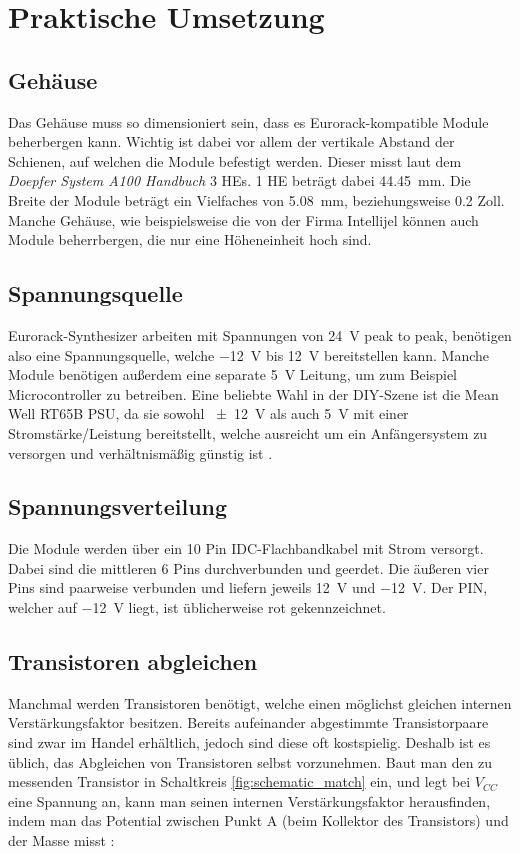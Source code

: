 \chapter{Praktische Umsetzung}

\section{Gehäuse}
\label{sec:orgbf5b01b}
Das Gehäuse muss so dimensioniert sein, dass es Eurorack-kompatible Module beherbergen kann. Wichtig ist dabei vor allem der vertikale Abstand der Schienen, auf welchen die Module befestigt werden. Dieser misst laut dem \emph{Doepfer System A100 Handbuch} \cite{doepfer:A-100} 3 \acp{HE}. 1 \ac{HE} beträgt dabei \SI{44.45}{\milli\meter}. Die Breite der Module beträgt ein Vielfaches von \SI{5.08}{\milli\meter}, beziehungsweise 0.2 Zoll. Manche Gehäuse, wie beispielsweise die von der Firma Intellijel können auch Module beherrbergen, die nur eine Höheneinheit hoch sind.

\section{Spannungsquelle}
\label{sec:org899c54b}
Eurorack-Synthesizer arbeiten mit Spannungen von \SI{24}{\volt} peak to peak, benötigen also eine Spannungsquelle, welche \SI{-12}{\volt} bis \SI{+12}{\volt} bereitstellen kann. Manche Module benötigen außerdem eine separate \SI{5}{\volt} Leitung, um zum Beispiel Microcontroller zu betreiben. Eine beliebte Wahl in der DIY-Szene ist die Mean Well RT65B PSU, da sie sowohl \SI{\pm 12}{\volt} als auch \SI{5}{\volt} mit einer Stromstärke/Leistung bereitstellt, welche ausreicht um ein Anfängersystem zu versorgen und verhältnismäßig günstig ist \cite{modularsynthlab:rt65b}.

\section{Spannungsverteilung}
\label{sec:org29bf4b1}
Die Module werden über ein 10 Pin IDC-Flachbandkabel mit Strom versorgt. Dabei sind die mittleren 6 Pins durchverbunden und geerdet. Die äußeren vier Pins sind paarweise verbunden und liefern jeweils \SI{+12}{\volt} und \SI{-12}{\volt}. Der PIN, welcher auf \SI{-12}{\volt} liegt, ist üblicherweise rot gekennzeichnet.

\section{Transistoren abgleichen \label{Match_Transistors}}
\label{sec:org9ef8bec}
Manchmal werden Transistoren benötigt, welche einen möglichst gleichen internen Verstärkungsfaktor besitzen. Bereits aufeinander abgestimmte Transistorpaare sind zwar im Handel erhältlich, jedoch sind diese oft kostspielig. Deshalb ist es üblich, das Abgleichen von Transistoren selbst vorzunehmen. Baut man den zu messenden Transistor in Schaltkreis \ref{fig:schematic_match} ein, und legt bei \(V_{CC}\) eine Spannung an, kann man seinen internen Verstärkungsfaktor herausfinden, indem man das Potential zwischen Punkt A (beim Kollektor des Transistors) und der Masse misst \cite{match_transistors}:

